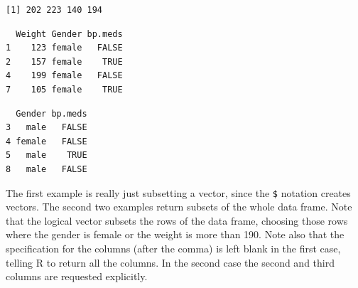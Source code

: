\documentclass[
]{krantz}
\makeatletter
\newenvironment{Shaded}{\begin{snugshade}}{\end{snugshade}}
\newcommand{\DecValTok}[1]{\textcolor[rgb]{0.06,0.06,0.06}{#1}}
\newcommand{\NormalTok}[1]{#1}
\newcommand{\OperatorTok}[1]{\textcolor[rgb]{0.43,0.43,0.43}{\textbf{#1}}}
\newcommand{\StringTok}[1]{\textcolor[rgb]{0.5,0.5,0.5}{#1}}
\newenvironment{kframe}{%
\medskip{}
\setlength{\fboxsep}{.8em}
 \def\at@end@of@kframe{}%
 \ifinner\ifhmode%
  \def\at@end@of@kframe{\end{minipage}}%
  \begin{minipage}{\columnwidth}%
 \fi\fi%
 \def\FrameCommand##1{\hskip\@totalleftmargin \hskip-\fboxsep
 \colorbox{shadecolor}{##1}\hskip-\fboxsep
     \hskip-\linewidth \hskip-\@totalleftmargin \hskip\columnwidth}%
 \MakeFramed {\advance\hsize-\width
   \@totalleftmargin\z@ \linewidth\hsize
   \@setminipage}}%
 {\par\unskip\endMakeFramed%
 \at@end@of@kframe}
\renewenvironment{Shaded}{\begin{kframe}}{\end{kframe}}
\makeatother
\begin{document}
\begin{Shaded}
\end{Shaded}

\begin{verbatim}
[1] 202 223 140 194
\end{verbatim}

\begin{Shaded}
\end{Shaded}

\begin{verbatim}
  Weight Gender bp.meds
1    123 female   FALSE
2    157 female    TRUE
4    199 female   FALSE
7    105 female    TRUE
\end{verbatim}

\begin{Shaded}
\end{Shaded}

\begin{verbatim}
  Gender bp.meds
3   male   FALSE
4 female   FALSE
5   male    TRUE
8   male   FALSE
\end{verbatim}

The first example is really just subsetting a vector, since the \texttt{\$} notation creates vectors. The second two examples return subsets of the whole data frame. Note that the logical vector subsets the rows of the data frame, choosing those rows where the gender is female or the weight is more than 190. Note also that the specification for the columns (after the comma) is left blank in the first case, telling R to return all the columns. In the second case the second and third columns are requested explicitly.
\end{document}
